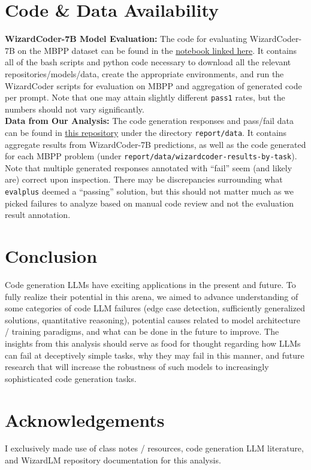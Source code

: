 \documentclass[10pt]{article}
\newcommand{\code}[1]{\texttt{#1}}
\theoremstyle{definition}
\begin{document}
\section{Code \& Data Availability}
\noindent\textbf{WizardCoder-7B Model Evaluation:} The code for evaluating WizardCoder-7B on the MBPP dataset can be found in the \href{https://colab.research.google.com/drive/1h_GR9C5uA2uJORi7ZhAuGsKP4tWUkY4Z?usp=sharing}{notebook linked here}. It contains all of the bash scripts and python code necessary to download all the relevant repositories/models/data, create the appropriate environments, and run the WizardCoder scripts for evaluation on MBPP and aggregation of generated code per prompt. Note that one may attain slightly different \code{pass1} rates, but the numbers should not vary significantly.\\

\noindent\textbf{Data from Our Analysis:} The code generation responses and pass/fail data can be found in \href{https://github.com/0xArsi/cse256_analysis_study.git}{this repository} under the directory \code{report/data}. It contains aggregate results from WizardCoder-7B predictions, as well as the code generated for each MBPP problem (under \code{report/data/wizardcoder-results-by-task}). Note that multiple generated responses annotated with ``fail'' seem (and likely are) correct upon inspection. There may be discrepancies surrounding what \code{evalplus} deemed a ``passing'' solution, but this should not matter much as we picked failures to analyze based on manual code review and not the evaluation result annotation.

\section{Conclusion}
\noindent Code generation LLMs have exciting applications in the present and future. To fully realize their potential in this arena, we aimed to advance understanding of some categories of code LLM failures (edge case detection, sufficiently generalized solutions, quantitative reasoning), potential causes related to model architecture / training paradigms, and what can be done in the future to improve. The insights from this analysis should serve as food for thought regarding how LLMs can fail at deceptively simple tasks, why they may fail in this manner, and future research that will increase the robustness of such models to increasingly sophisticated code generation tasks.



\section{Acknowledgements}
\noindent I exclusively made use of class notes / resources, code generation LLM literature, and WizardLM repository documentation for this analysis.


\end{document}
